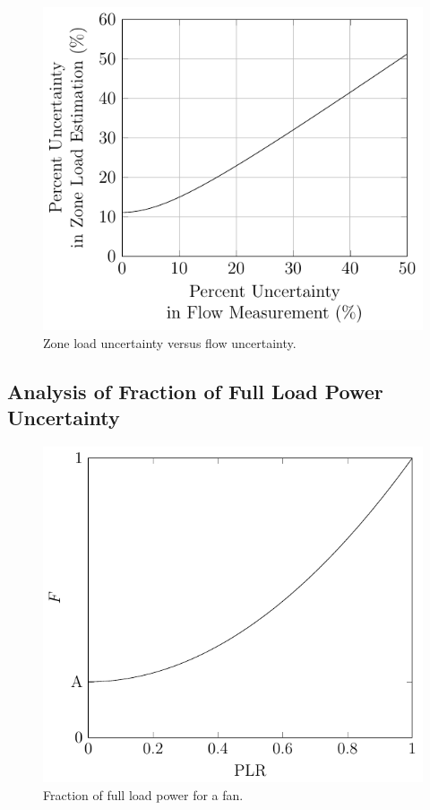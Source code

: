 \begin{figure}
\centering
\includegraphics{Plots/2017-05-16-ZoneLoadUncertaintyVsFlowUncertainty.pdf}
\caption{Zone load uncertainty versus flow uncertainty.}
\label{fig:ZoneLoadUncVsFlowUnc}
\end{figure}






\subsection{Analysis of Fraction of Full Load Power Uncertainty}
\begin{figure}
\centering
\includegraphics{Plots/2017-05-12-Fcurve.pdf}
\caption{Fraction of full load power for a fan.}
\label{fig:FCurve}
\end{figure}

